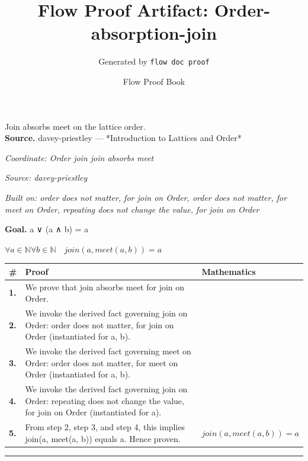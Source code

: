 \documentclass[11pt]{article}
\title{Flow Proof Artifact: Order-absorption-join}
\author{Generated by \texttt{flow doc proof}}
\date{Flow Proof Book}
\theoremstyle{definition}
\begin{document}
\maketitle
Join absorbs meet on the lattice order.\\[0.5em]
\textbf{Source.} davey-priestley — *Introduction to Lattices and Order*\\[0.5em]
\bigskip
{}\par
\smallskip\noindent\textit{Coordinate: Order \cdot join \cdot join absorbs meet}\par
\smallskip\noindent\textit{Source: davey-priestley}\par
\smallskip\noindent\textit{Built on: order does not matter, for join on Order, order does not matter, for meet on Order, repeating does not change the value, for join on Order}\par
\medskip
\noindent\textbf{Goal.} a ∨ (a ∧ b) = a\par
\noindent$\displaystyle \forall a \in \mathbb{N} \forall b \in \mathbb{N}\quad join(a, meet(a, b)) = a$\par
\medskip
\noindent
\begin{tabular}{@{} >{\raggedright\arraybackslash}p{} >{\raggedright\arraybackslash}p{} >{\raggedleft\arraybackslash}p{} @{}}
\textbf{\#} & \textbf{Proof} & \textbf{Mathematics} \\
\midrule
\textbf{1.} & We prove that join absorbs meet for join on Order. & \\[0.45em]
\textbf{2.} & We invoke the derived fact governing join on Order: order does not matter, for join on Order (instantiated for a, b). & \\[0.45em]
\textbf{3.} & We invoke the derived fact governing meet on Order: order does not matter, for meet on Order (instantiated for a, b). & \\[0.45em]
\textbf{4.} & We invoke the derived fact governing join on Order: repeating does not change the value, for join on Order (instantiated for a). & \\[0.45em]
\textbf{5.} & From step 2, step 3, and step 4, this implies join(a, meet(a, b)) equals a. Hence proven. & $\displaystyle join(a, meet(a, b)) = a$ \\[0.45em]
\bottomrule
\end{tabular}
\label{thm:Order-join-join_absorbs_meet}
\par\medskip\hrule
\end{document}
